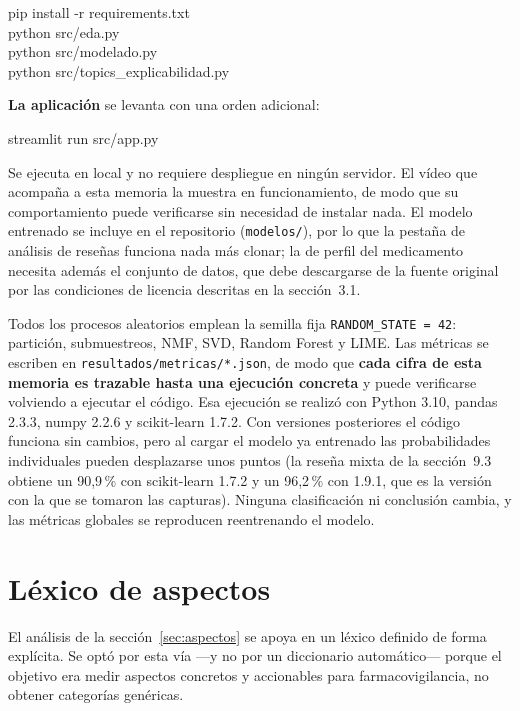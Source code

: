 \documentclass[11pt,a4paper]{article}
\begin{document}
\vspace{0.15cm}
{\small\ttfamily
pip install -r requirements.txt\\
python src/eda.py\\
python src/modelado.py\\
python src/topics\_explicabilidad.py
}
\vspace{0.15cm}

\textbf{La aplicación} se levanta con una orden adicional:

\vspace{0.15cm}
{\small\ttfamily streamlit run src/app.py}
\vspace{0.15cm}

Se ejecuta en local y no requiere despliegue en ningún servidor. El vídeo que
acompaña a esta memoria la muestra en funcionamiento, de modo que su
comportamiento puede verificarse sin necesidad de instalar nada. El modelo
entrenado se incluye en el repositorio (\texttt{modelos/}), por lo que la
pestaña de análisis de reseñas funciona nada más clonar; la de perfil del
medicamento necesita además el conjunto de datos, que debe descargarse de la
fuente original por las condiciones de licencia descritas en la
sección~3.1.

Todos los procesos aleatorios emplean la semilla fija
\texttt{RANDOM\_STATE = 42}: partición, submuestreos, NMF, SVD, Random Forest y
LIME. Las métricas se escriben en \texttt{resultados/metricas/*.json}, de modo
que \textbf{cada cifra de esta memoria es trazable hasta una ejecución concreta}
y puede verificarse volviendo a ejecutar el código. Esa ejecución se realizó
con Python 3.10, pandas 2.3.3, numpy 2.2.6 y scikit-learn 1.7.2. Con versiones
posteriores el código funciona sin cambios, pero al cargar el modelo ya
entrenado las probabilidades individuales pueden desplazarse unos puntos (la
reseña mixta de la sección~9.3 obtiene un 90,9\,\% con scikit-learn 1.7.2 y
un 96,2\,\% con 1.9.1, que es la versión con la que se tomaron las capturas).
Ninguna clasificación ni conclusión cambia, y las métricas globales se
reproducen reentrenando el modelo.

\section{Léxico de aspectos}

El análisis de la sección~\ref{sec:aspectos} se apoya en un léxico definido de
forma explícita. Se optó por esta vía —y no por un diccionario automático—
porque el objetivo era medir aspectos concretos y accionables para
farmacovigilancia, no obtener categorías genéricas.
\end{document}
